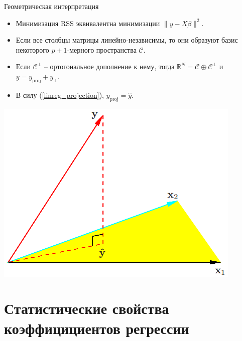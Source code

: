 \documentclass[9pt]{beamer}
\begin{document}
\begin{frame}{Геометрическая интерпретация}
\begin{itemize}
    \item Минимизация RSS эквивалентна минимизации $\|y - X\beta\|^2$.
    \item Если все столбцы матрицы линейно-независимы, то они образуют базис некоторого $p+1$-мерного пространства $\mathcal{C}$.
    \item Если $\mathcal{C}^\perp$ -- ортогональное дополнение к нему, тогда $\mathbb{R}^N = \mathcal{C} \oplus \mathcal{C}^\perp$ и $y = y_{\text{proj}} + y_\perp$.
    \item В силу (\ref{linreg_projection}), $y_{\text{proj}} = \hat y$.
\end{itemize}
\begin{center}
    \includegraphics[height=0.5\textheight]{img/linear_regression_projection.png}
\end{center}
\end{frame}

\section{Статистические свойства коэффицициентов регрессии}
\end{document}
